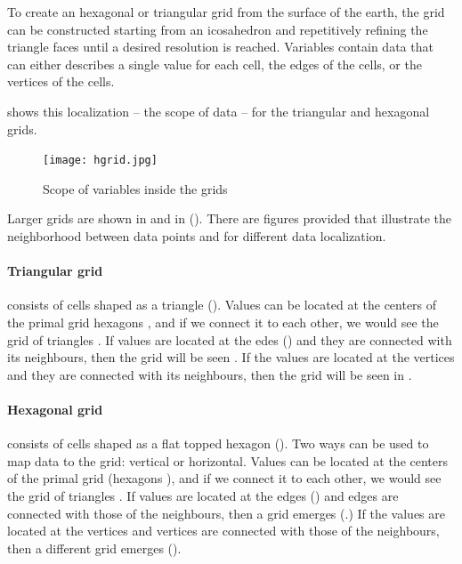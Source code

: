 \documentclass{../../template/esiwace-report}
\begin{document}
To create an hexagonal or triangular grid from the surface of the earth, the grid can be constructed starting from an icosahedron and repetitively refining the triangle faces until a desired resolution is reached.
Variables contain data that can either describes a single value for each cell, the edges of the cells, or the vertices of the cells.

 shows this localization -- the scope of data -- for the triangular and hexagonal grids.

\begin{figure}[tb]
  \centering
  \texttt{[image: hgrid.jpg]}
  \caption{Scope of variables inside the grids}
  \label{fig:grid}
\end{figure}

Larger grids are shown in  and in ().
There are figures provided that illustrate the neighborhood between data points and for different data localization.

\paragraph{Triangular grid} consists of cells shaped as a triangle (). 
Values can be located at the centers of the primal grid hexagons , and if we connect it to each other, we would see the grid of triangles .
If values are located at the edes () and they are connected with its neighbours, then the grid will be seen .
If the values are located at the vertices and they are connected with its neighbours, then the grid will be seen in .

\paragraph{Hexagonal grid} consists of cells shaped as a flat topped hexagon ().
Two ways can be used to map data to the grid: vertical or horizontal.
Values can be located at the centers of the primal grid (hexagons ), and if we connect it to each other, we would see the grid of triangles .
If values are located at the edges () and edges are connected with those of the neighbours, then a grid emerges (.)
If the values are located at the vertices and vertices are connected with those of the neighbours, then a different grid emerges ().
\end{document}
